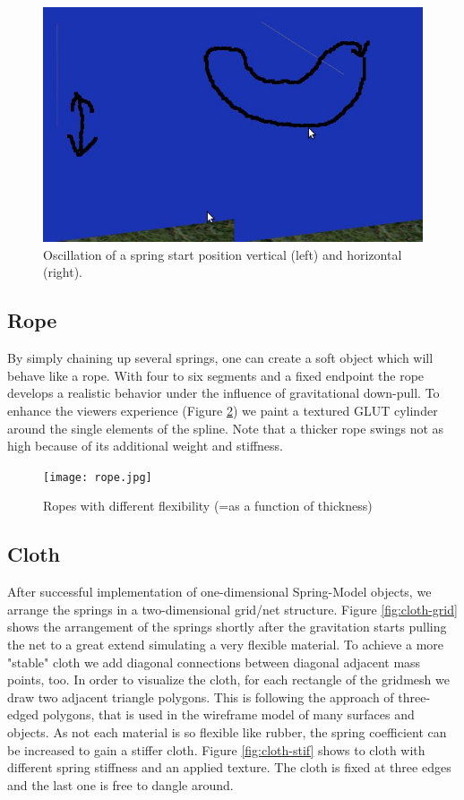 \documentclass[11pt]{article}
\begin{document}
\begin{figure}[h]
\centering
\includegraphics[scale=0.4]{spring-oszi.jpg}
\caption{Oscillation of a spring start position vertical (left) and horizontal (right).}
\label{fig:spring-oszi}
\end{figure}

\subsection{Rope}
By simply chaining up several springs, one can create a soft object which will behave like a rope. With four to six segments and a fixed endpoint the rope develops a realistic behavior under the influence of gravitational down-pull. To enhance the viewers experience (Figure \ref{fig:rope}) we paint a textured GLUT cylinder around the single elements of the spline. Note that a thicker rope swings not as high because of its additional weight and stiffness.

\begin{figure}[h]
\centering
\texttt{[image: rope.jpg]}
\caption{Ropes with different flexibility (=as a function of thickness)}
\label{fig:rope}
\end{figure}

\subsection{Cloth}
After successful implementation of one-dimensional Spring-Model objects, we arrange the springs in a two-dimensional grid/net structure. Figure \ref{fig:cloth-grid} shows the arrangement of the springs shortly after the gravitation starts pulling the net to a great extend simulating a very flexible material. To achieve a more "stable" cloth we add diagonal connections between diagonal adjacent mass points, too. In order to visualize the cloth, for each rectangle of the gridmesh we draw two adjacent triangle polygons. This is following the approach of three-edged polygons, that is used in the wireframe model of many surfaces and objects. As not each material is so flexible like rubber, the spring coefficient can be increased to gain a stiffer cloth. Figure \ref{fig:cloth-stif} shows to cloth with different spring stiffness and an applied texture. The cloth is fixed at three edges and the last one is free to dangle around.
\end{document}
